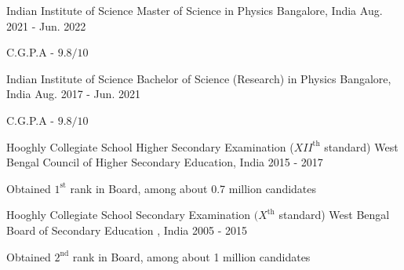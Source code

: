 

\begin{cventries}

    \cventry
	{Indian Institute of Science} %
	{Master of Science in Physics} %
	{Bangalore, India} %
	{Aug. 2021 - Jun. 2022} %
	{
	\begin{cvitems} %
		\item {C.G.P.A - $9.8/10$}
	\end{cvitems}
	}

  \cventry
    {Indian Institute of Science} %
    {Bachelor of Science (Research) in Physics} %
    {Bangalore, India} %
    {Aug. 2017 - Jun. 2021} %
    {
      \begin{cvitems} %
        \item {C.G.P.A - $9.8/10$}
      \end{cvitems}
    }

  \cventry
	{Hooghly Collegiate School} %
	{Higher Secondary Examination ($XII^{\text{th}}$ standard)} %
	{West Bengal Council of Higher Secondary Education, India} %
	{2015 - 2017} %
	{
	\begin{cvitems} %
		\item {Obtained $1^{\text{st}}$ rank in Board, among about 0.7 million candidates}
	\end{cvitems}
	}
  \cventry
	{Hooghly Collegiate School} %
	{Secondary Examination $(X^{\text{th}}$ standard)} %
	{West Bengal Board of Secondary Education , India} %
	{2005 - 2015} %
	{
	\begin{cvitems} %
		\item {Obtained $2^{\text{nd}}$ rank in Board, among about 1 million candidates}
	\end{cvitems}
	}


\end{cventries}
